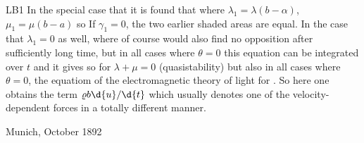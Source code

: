 \begin{paper}{LB1}
In the special case that
it is found that
where $\lambda_1 = \lambda(b-\alpha)$, $\mu_1 = \mu(b-a)$ so
If $\gamma_1=0$, the two earlier shaded areas are equal. In the case that $\lambda_1=0$ as well, where of course  would also find no opposition after sufficiently long time, but in all cases where $\theta=0$ this equation can be integrated over $t$ and it  gives
so for $\lambda+\mu=0$ (quasistability) but also in all cases where $\theta=0$, the equatiom of the electromagnetic theory of light for . So here one obtains the term $\varrho b \d{u}/\d{t}$ which usually denotes one of the velocity-dependent forces in a totally different manner.

Munich, October 1892

\end{paper}
